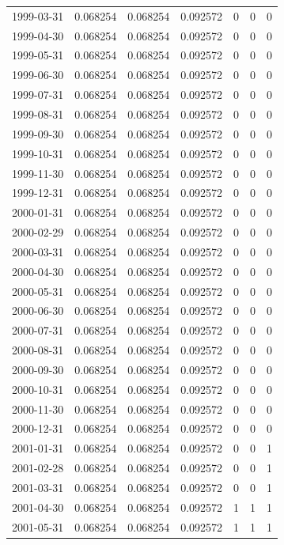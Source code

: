 \documentclass[conference,onecolumn]{IEEEtran}
\begin{document}
\begin{longtable}{|c|c|c|c|c|c|c|}
1999-03-31 & 0.068254 & 0.068254 & 0.092572 & 0 & 0 & 0 \\
1999-04-30 & 0.068254 & 0.068254 & 0.092572 & 0 & 0 & 0 \\
1999-05-31 & 0.068254 & 0.068254 & 0.092572 & 0 & 0 & 0 \\
1999-06-30 & 0.068254 & 0.068254 & 0.092572 & 0 & 0 & 0 \\
1999-07-31 & 0.068254 & 0.068254 & 0.092572 & 0 & 0 & 0 \\
1999-08-31 & 0.068254 & 0.068254 & 0.092572 & 0 & 0 & 0 \\
1999-09-30 & 0.068254 & 0.068254 & 0.092572 & 0 & 0 & 0 \\
1999-10-31 & 0.068254 & 0.068254 & 0.092572 & 0 & 0 & 0 \\
1999-11-30 & 0.068254 & 0.068254 & 0.092572 & 0 & 0 & 0 \\
1999-12-31 & 0.068254 & 0.068254 & 0.092572 & 0 & 0 & 0 \\
2000-01-31 & 0.068254 & 0.068254 & 0.092572 & 0 & 0 & 0 \\
2000-02-29 & 0.068254 & 0.068254 & 0.092572 & 0 & 0 & 0 \\
2000-03-31 & 0.068254 & 0.068254 & 0.092572 & 0 & 0 & 0 \\
2000-04-30 & 0.068254 & 0.068254 & 0.092572 & 0 & 0 & 0 \\
2000-05-31 & 0.068254 & 0.068254 & 0.092572 & 0 & 0 & 0 \\
2000-06-30 & 0.068254 & 0.068254 & 0.092572 & 0 & 0 & 0 \\
2000-07-31 & 0.068254 & 0.068254 & 0.092572 & 0 & 0 & 0 \\
2000-08-31 & 0.068254 & 0.068254 & 0.092572 & 0 & 0 & 0 \\
2000-09-30 & 0.068254 & 0.068254 & 0.092572 & 0 & 0 & 0 \\
2000-10-31 & 0.068254 & 0.068254 & 0.092572 & 0 & 0 & 0 \\
2000-11-30 & 0.068254 & 0.068254 & 0.092572 & 0 & 0 & 0 \\
2000-12-31 & 0.068254 & 0.068254 & 0.092572 & 0 & 0 & 0 \\
2001-01-31 & 0.068254 & 0.068254 & 0.092572 & 0 & 0 & 1 \\
2001-02-28 & 0.068254 & 0.068254 & 0.092572 & 0 & 0 & 1 \\
2001-03-31 & 0.068254 & 0.068254 & 0.092572 & 0 & 0 & 1 \\
2001-04-30 & 0.068254 & 0.068254 & 0.092572 & 1 & 1 & 1 \\
2001-05-31 & 0.068254 & 0.068254 & 0.092572 & 1 & 1 & 1 \\

\end{longtable}
\end{document}
